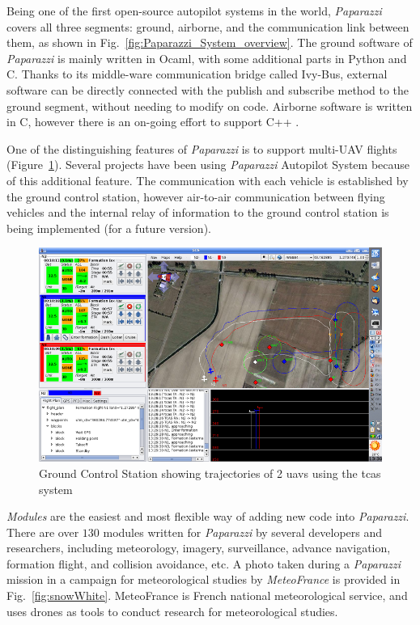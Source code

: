 Being one of the first open-source autopilot systems in the world, \emph{Paparazzi} covers all three segments: ground, airborne, and the communication link between them, as shown in Fig.~\ref{fig:Paparazzi_System_overview}. 
The ground software of \emph{Paparazzi} is mainly written in Ocaml, with some additional parts in Python and C. 
Thanks to its middle-ware communication bridge called Ivy-Bus, external software can be directly connected with the publish and subscribe method to the ground segment, without needing to modify on code.
Airborne software is written in C, however there is an on-going effort to support C++ \cite{baskaya2016flexible}.

One of the distinguishing features of \emph{Paparazzi} is to support multi-UAV flights (Figure~\ref{fig:pic2}). Several projects have been using \emph{Paparazzi} Autopilot System because of this additional feature. The communication with each vehicle is established by the ground control station, however air-to-air communication between flying vehicles and the internal relay of information to the ground control station is being implemented (for a future version).

\begin{figure}
	\centering
	\includegraphics[width=1\textwidth]{figures/pic2}
	\caption{Ground Control Station showing trajectories of 2 \gls{uav}s using the \gls{tcas} system}
	\label{fig:pic2}
\end{figure}

\emph{Modules} are the easiest and most flexible way of adding new code into \emph{Paparazzi}. 
There are over $130$ modules written for \emph{Paparazzi} by several developers and researchers, including meteorology, imagery, surveillance, advance navigation, formation flight, and collision avoidance, etc. 
A photo taken during a \emph{Paparazzi} mission in a campaign for meteorological studies by \emph{MeteoFrance} is provided in Fig.~\ref{fig:snowWhite}. 
MeteoFrance is French national meteorological service, and uses drones as tools to conduct research for meteorological studies.

